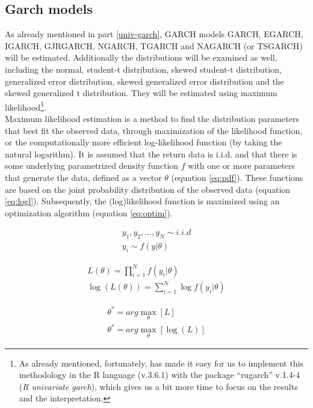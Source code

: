 \documentclass[a4paper, twoside]{templates/ociamthesis}
\begin{document}
\hypertarget{garch-method}{%
\subsection{Garch models}\label{garch-method}}

\noindent As already mentioned in part \ref{univ-garch}, GARCH models GARCH, EGARCH, IGARCH, GJRGARCH, NGARCH, TGARCH and NAGARCH (or TSGARCH) will be estimated. Additionally the distributions will be examined as well, including the normal, student-t distribution, skewed student-t distribution, generalized error distribution, skewed generalized error distribution and the skewed generalized t distribution. They will be estimated using maximum likelihood\footnote{ As already mentioned, fortunately, \textcite{alexios2020} has made it easy for us to implement this methodology in the R language (v.3.6.1) with the package ``rugarch'' v.1.4-4 (\emph{R univariate garch}), which gives us a bit more time to focus on the results and the interpretation.}.~\\

\noindent Maximum likelihood estimation is a method to find the distribution parameters that best fit the observed data, through maximization of the likelihood function, or the computationally more efficient log-likelihood function (by taking the natural logarithm). It is assumed that the return data is i.i.d. and that there is some underlying parametrized density function \(f\) with one or more parameters that generate the data, defined as a vector \(\theta\) (equation \eqref{eq:pdf}). These functions are based on the joint probability distribution of the observed data (equation \eqref{eq:logl}). Subsequently, the (log)likelihood function is maximized using an optimization algorithm (equation \eqref{eq:optim}).

\begin{align} 
  y_1,y_2,...,y_N \sim i.i.d
    \\
  y_i \sim f(y|\theta)
 \label{eq:pdf}
\end{align}

\begin{align} 
 L(\theta) = \prod^N_{i=1}f(y_i|\theta)
  \\
 \log(L(\theta)) = \sum^N_{i=1} \log f(y_i |\theta)
 \label{eq:logl}
\end{align}

\begin{align} 
\theta^{*} = arg \max_{\theta} [ L] \\
\theta^{*} = arg \max_{\theta} [\log(L)]
 \label{eq:optim}
\end{align}
\end{document}
